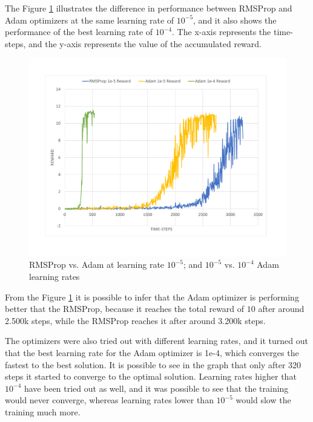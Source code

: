 The Figure \ref{fig:OptimizersReward} illustrates the difference in performance between RMSProp and Adam optimizers at the same learning rate of $10^{-5}$, and it also shows the performance of the best learning rate of $10^{-4}$. The x-axis represents the time-steps, and the y-axis represents the value of the accumulated reward.
\begin{figure}[H]
	\centering
	\includegraphics[width=\textwidth]{Figures/OptimizersReward}
	\caption{RMSProp vs. Adam at learning rate $10^{-5}$; and $10^{-5}$ vs. $10^{-4}$ Adam learning rates}
	\label{fig:OptimizersReward}
\end{figure}
From the Figure \ref{fig:OptimizersReward} it is possible to infer that the Adam optimizer is performing better that the RMSProp, because it reaches the total reward of $10$ after around 2.500k steps, while the RMSProp reaches it after around 3.200k steps.

The optimizers were also tried out with different learning rates, and it turned out that the best learning rate for the Adam optimizer is 1e-4, which converges the fastest to the best solution. It is possible to see in the graph that only after 320 steps it started to converge to the optimal solution. Learning rates higher that $10^{-4}$ have been tried out as well, and it was possible to see that the training would never converge, whereas learning rates lower than $10^{-5}$ would slow the training much more.